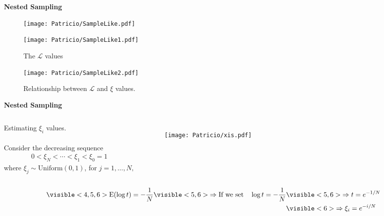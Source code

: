 \begin{frame}{\small{\textbf{Nested Sampling}}}
\begin{overprint}
\begin{figure}[]    		
		\texttt{[image: Patricio/SampleLike.pdf]}
\end{figure}
\begin{figure}[]    		
		\texttt{[image: Patricio/SampleLike1.pdf]}
		\caption{The $\mathcal L$ values }
\end{figure}
\begin{figure}[]    		
		\texttt{[image: Patricio/SampleLike2.pdf]}
		\caption{Relationship between $\mathcal L$ and $\xi$ values.}
\end{figure}
\end{overprint}
\end{frame}
\begin{frame}{\small{\textbf{Nested Sampling}}}
\begin{columns}[T]
Estimating $\xi_{i}$ values.\\~\\
Consider the decreasing sequence
\begin{align*}
0<\xi_{N}<\cdots<\xi_{1}<\xi_{0}=1
\end{align*}
where $\xi_{j}\sim\text{Uniform}(0,1)$, for $j=1,\ldots,N,$ 
\begin{figure}
   \texttt{[image: Patricio/xis.pdf]}
\end{figure}
\end{columns}
\begin{align*}
\visible<4,5,6>{\text{E}(\log t) = -\frac{1}{N}} 
\visible<5,6>{\Rightarrow \text{If we set}\quad \log t = -\frac{1}{N}}&\visible<5,6>{\Rightarrow t = e^{-1/N}}\\
&\visible<6>{\Rightarrow \xi_{i}= e^{-i/N}}
\end{align*}
\end{frame}
